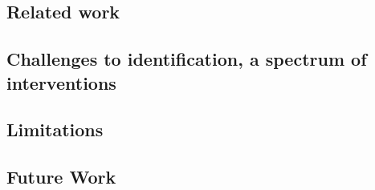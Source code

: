 \subsection{Related work}

\subsection{Challenges to identification, a spectrum of interventions}

\subsection{Limitations}

\subsection{Future Work}
